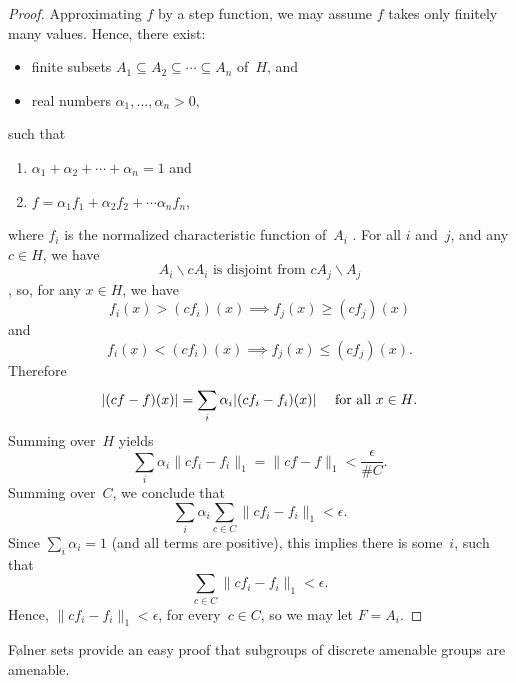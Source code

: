 \begin{proof}
Approximating $f$ by a step function, we may assume $f$ takes only finitely many values. Hence, there exist:
\noprelistbreak
	\begin{itemize}
	\item finite subsets $A_1 \subseteq A_2 \subseteq \cdots \subseteq A_n$ of~$H$,
	and
	\item real numbers $\alpha_1, \ldots,\alpha_n > 0$,
	\end{itemize}
such that
\noprelistbreak
	\begin{enumerate}
	\item $\alpha_1 + \alpha_2 + \cdots  + \alpha_n = 1$
	and
	\item $f = \alpha_1 f_1 + \alpha_2 f_2 + \cdots \alpha_n f_n$,
	\end{enumerate}
where $f_i$ is the normalized characteristic function of~$A_i$ . For all $i$ and~$j$, and any $c \in H$, we have
	\begin{equation} \label{cAiDisjAj}
	\text{$A_i \smallsetminus cA_i$ is disjoint from $cA_j \smallsetminus A_j$} 
	\end{equation}
, so, for any $x \in H$, we have
	$$f_i(x) > (c f_i)(x) \implies f_j(x) \ge (cf_j)(x)$$
and
	$$f_i(x) < (cf_i)(x) \implies f_j(x) \le (cf_j)(x) .$$
Therefore
	$$ \text{$\displaystyle | (cf - f)(x)| = \sum_i  \alpha_i | (cf_i - f_i)(x)|$ \quad for all $x \in H$} .$$
Summing over~$H$ yields
	$$ \sum_i \alpha_i \|cf_i - f_i \|_1
	= \|cf - f \|_1
	< \frac{\epsilon}{\#C} .$$
Summing over~$C$, we conclude that
	$$ \sum_i \alpha_i \sum_{c \in C} \|cf_i - f_i \|_1 < \epsilon .$$
Since $\sum_i \alpha_i = 1$ (and all terms are positive), this implies there is some~$i$, such that
	$$ \sum_{c \in C} \|cf_i - f_i \|_1 < \epsilon .$$
Hence, $\|cf_i - f_i \|_1 < \epsilon$, for every~$c \in C$, so we may let $F = A_i$.
\end{proof}
 
 
\begin{rem} \label{FolnerSubgrp}
F\o lner sets provide an easy proof that subgroups of discrete amenable groups are amenable.
\end{rem}

